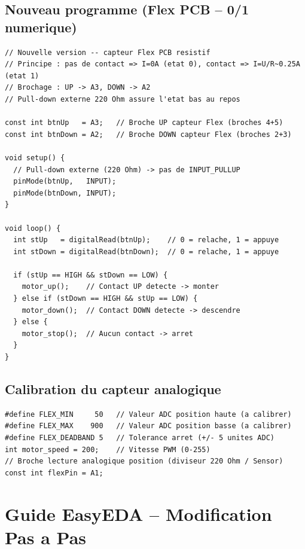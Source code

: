 \documentclass[12pt,a4paper]{article}
\begin{document}
\subsection{Nouveau programme (Flex PCB -- 0/1 numerique)}

\begin{lstlisting}[style=cppstyle, caption={Lecture Flex PCB (numerique 0/1)}]
// Nouvelle version -- capteur Flex PCB resistif
// Principe : pas de contact => I=0A (etat 0), contact => I=U/R~0.25A (etat 1)
// Brochage : UP -> A3, DOWN -> A2
// Pull-down externe 220 Ohm assure l'etat bas au repos

const int btnUp   = A3;   // Broche UP capteur Flex (broches 4+5)
const int btnDown = A2;   // Broche DOWN capteur Flex (broches 2+3)

void setup() {
  // Pull-down externe (220 Ohm) -> pas de INPUT_PULLUP
  pinMode(btnUp,   INPUT);
  pinMode(btnDown, INPUT);
}

void loop() {
  int stUp   = digitalRead(btnUp);    // 0 = relache, 1 = appuye
  int stDown = digitalRead(btnDown);  // 0 = relache, 1 = appuye

  if (stUp == HIGH && stDown == LOW) {
    motor_up();    // Contact UP detecte -> monter
  } else if (stDown == HIGH && stUp == LOW) {
    motor_down();  // Contact DOWN detecte -> descendre
  } else {
    motor_stop();  // Aucun contact -> arret
  }
}
\end{lstlisting}

\subsection{Calibration du capteur analogique}

\begin{lstlisting}[style=cppstyle, caption={Parametres de calibration}]
#define FLEX_MIN     50   // Valeur ADC position haute (a calibrer)
#define FLEX_MAX    900   // Valeur ADC position basse (a calibrer)
#define FLEX_DEADBAND 5   // Tolerance arret (+/- 5 unites ADC)
int motor_speed = 200;    // Vitesse PWM (0-255)
// Broche lecture analogique position (diviseur 220 Ohm / Sensor)
const int flexPin = A1;
\end{lstlisting}

\section{Guide EasyEDA -- Modification Pas a Pas}
\end{document}
